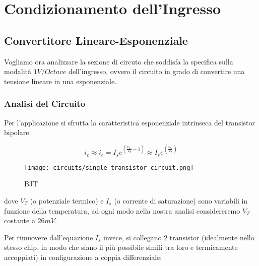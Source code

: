 \chapter{Condizionamento dell'Ingresso}


\section{Convertitore Lineare-Esponenziale}


Vogliamo ora analizzare la sezione di circuto che soddisfa la specifica sulla modalità
$1V/Octave$ dell'ingresso, ovvero il circuito in grado di convertire una tensione
lineare in una esponenziale.


\subsection*{Analisi del Circuito}


Per l'applicazione si sfrutta la caratteristica esponenziale intrinseca del transistor
bipolare:

\begin{displaymath}
    i_e\approx i_c=I_se^{\left(\frac{v_{be}}{V_T}-1\right)}
    \approx I_se^{\left(\frac{v_{be}}{V_T}\right)}
\end{displaymath}

\begin{figure}[ht]
    \centering
    \texttt{[image: circuits/single\_transistor\_circuit.png]}
    \caption{BJT}
    \label{bjt}
\end{figure}

dove $V_T$ (o potenziale termico) e $I_s$ (o corrente di saturazione) sono variabili in
funzione della temperatura, ad ogni modo nella nostra analisi considereremo $V_T$ costante
a $26mV$.

Per rimuovere dall'equazione $I_s$ invece, si collegano 2 transistor (idealmente nello
stesso chip, in modo che siano il più possibile simili tra loro e termicamente accoppiati)
in configurazione a coppia differenziale:
\medskip

